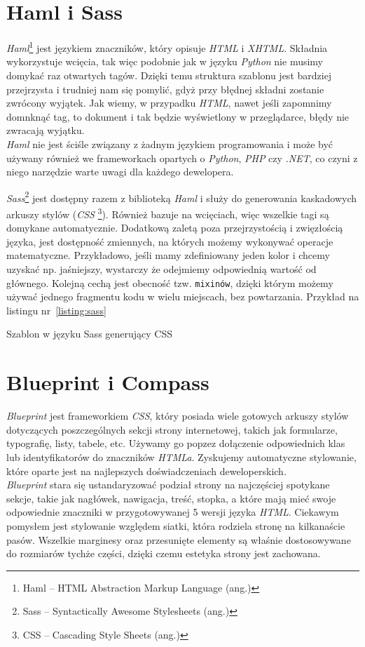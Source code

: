\documentclass[12pt,twoside]{report}
\begin{document}
\section{Haml i Sass}
\emph{Haml}\footnote{Haml -- HTML Abstraction Markup Language (ang.)} jest językiem
znaczników, który opisuje \emph{HTML} i \emph{XHTML}. Składnia wykorzystuje wcięcia, tak więc podobnie
jak w języku \emph{Python} nie musimy domykać raz otwartych tagów. Dzięki temu struktura
szablonu jest bardziej przejrzysta i trudniej nam się pomylić, gdyż przy błędnej składni
zostanie zwrócony wyjątek. Jak wiemy, w przypadku \emph{HTML}, nawet jeśli zapomnimy
domnknąć tag, to dokument i tak będzie wyświetlony w przeglądarce, błędy nie zwracają
wyjątku.\\
\emph{Haml} nie jest ściśle związany z żadnym językiem programowania i może być używany
również we frameworkach opartych o \emph{Python}, \emph{PHP} czy \emph{.NET}, co czyni
z niego narzędzie warte uwagi dla każdego dewelopera.


\emph{Sass}\footnote{Sass -- Syntactically Awesome Stylesheets (ang.)} jest dostępny razem
z biblioteką \emph{Haml} i służy do generowania kaskadowych arkuszy stylów (\emph{CSS
}\footnote{CSS -- Cascading Style Sheets (ang.)}). Również bazuje na wcięciach, więc
wszelkie tagi są domykane automatycznie. Dodatkową zaletą poza przejrzystością i
zwięzłością języka, jest dostępność zmiennych, na których możemy wykonywać operacje
matematyczne. Przykładowo, jeśli mamy zdefiniowany jeden kolor i chcemy uzyskać np.
jaśniejszy, wystarczy że odejmiemy odpowiednią wartość od głównego. Kolejną cechą jest
obecność tzw. \texttt{mixinów}, dzięki którym możemy używać jednego fragmentu kodu w wielu
miejscach, bez powtarzania. Przykład na listingu nr~\ref{listing:sass}

\begin{listing}
  
  \caption{Szablon w języku Sass generujący CSS}
  \label{listing:sass}
\end{listing}


\section{Blueprint i Compass}\label{sec:compass}
\emph{Blueprint} jest frameworkiem \emph{CSS}, który posiada wiele gotowych arkuszy stylów
dotyczących poszczególnych sekcji strony internetowej, takich jak formularze, typografię,
listy, tabele, etc. Używamy go popzez dołączenie odpowiednich klas lub identyfikatorów do
znaczników \emph{HTMLa}. Zyskujemy automatyczne stylowanie, które oparte jest na
najlepszych doświadczeniach deweloperskich.\\
\emph{Blueprint} stara się ustandaryzować podział strony na najczęściej spotykane sekcje,
takie jak nagłówek, nawigacja, treść, stopka, a które mają mieć swoje odpowiednie
znaczniki w przygotowywanej 5 wersji języka \emph{HTML}. Ciekawym pomysłem jest
stylowanie względem siatki, która rodziela stronę na kilkanaście pasów. Wszelkie marginesy
oraz przesunięte elementy są właśnie dostosowywane do rozmiarów tychże części, dzięki czemu
estetyka strony jest zachowana.
\end{document}

